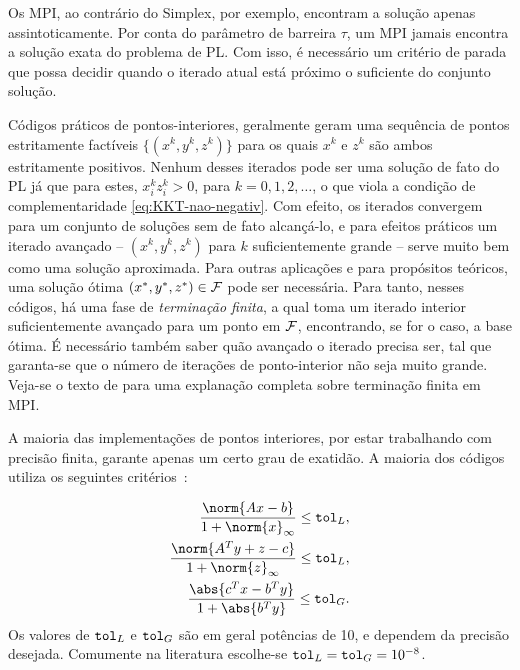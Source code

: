 Os \ac{MPI}, ao contrário do  Simplex, por exemplo, encontram a solução apenas
assintoticamente. Por conta do parâmetro de barreira $\tau$, um \ac{MPI} jamais encontra
a solução exata do problema de \ac{PL}. Com isso, é necessário um critério de
parada que possa decidir quando o iterado atual está próximo o suficiente 
do conjunto solução. 


Códigos práticos de pontos-interiores,  geralmente geram uma sequência de
pontos estritamente factíveis $\{(x^k,y^k,z^k)\}$ para os quais $x^k$ e $z^k$
são ambos estritamente positivos. Nenhum desses iterados pode ser uma solução de
fato do \ac{PL} já que para estes, $x^k_iz^k_i>0$, para $k=0,1,2,\ldots$, o que
viola a condição de complementaridade \eqref{eq:KKT-nao-negativ}. Com efeito, os
iterados convergem para um conjunto de soluções sem de fato alcançá-lo, e para
efeitos práticos um iterado avançado  -- $(x^k,y^k,z^k)$ para $k$ suficientemente
grande --  serve muito bem como uma solução aproximada. Para outras aplicações e
para propósitos teóricos, uma solução ótima $(x^*,y^*,z^*)\in\mathcal{F}$ pode ser
necessária. Para tanto, nesses códigos,  há uma fase de
\emph{terminação finita}, a qual toma um iterado interior suficientemente avançado
para um ponto em $\mathcal{F}$, encontrando, se for o caso, a base ótima. É
necessário também saber quão avançado o iterado precisa ser, tal que
garanta-se que o número de iterações de ponto-interior não seja muito grande. Veja-se o texto de \textcite[Cap. 7]{Wright:Primal-dual-interior-point:1997h} para uma explanação completa sobre terminação finita em \ac{MPI}.

A maioria das implementações de pontos interiores, por estar trabalhando com
precisão finita, garante apenas um certo grau de exatidão. A maioria
dos códigos utiliza os seguintes critérios~\cite{Gondzio:1996:CVI}:	


\begin{subequations}
\label{eq:termination-criteria}
\begin{align}
	\dfrac{\norm{Ax - b}}{1 + \norm{x}_{\infty}} \leq \tolL,
	\label{eq:termination-criteria-primal}\\ 
	\dfrac{\norm{A^Ty + z - c}}{1 + \norm{z}_{\infty}} \leq
	\tolL,\label{eq:termination-criteria-dual} \\ 
	\dfrac{\abs{c^Tx - b^T y}}{1 + \abs{b^Ty}}\leq
	\tolG.\label{eq:termination-criteria-gap}
\end{align}
\end{subequations}
Os valores de $\mathtt{tol}_{L}$ e $\mathtt{tol}_{G}$ são em geral potências de 10, e  dependem da precisão desejada. Comumente na literatura escolhe-se $\mathtt{tol}_{L}=\mathtt{tol}_{G}=10^{-8}$.  


